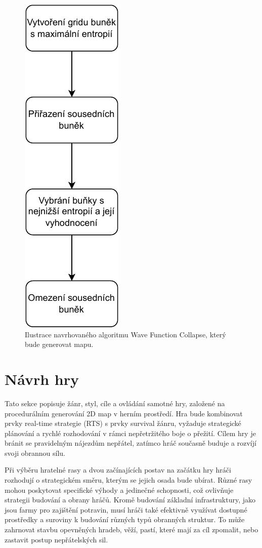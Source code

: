 \begin{figure}[H]
	\centering
	\includegraphics[scale=1]{obrazky-figures/wfcAlgorithm.pdf}
	\caption{Ilustrace navrhovaného algoritmu Wave Function Collapse, který bude generovat mapu.}
	\label{wfcAlgorithm}
\end{figure}

\section{Návrh hry}
\label{GameDesign}
Tato sekce popisuje žánr, styl, cíle a ovládání samotné hry, založené na procedurálním generování 2D map v herním prostředí. Hra bude kombinovat prvky real-time strategie (RTS) s prvky survival žánru, vyžaduje strategické plánování a rychlé rozhodování v rámci nepřetržitého boje o přežití. Cílem hry je bránit se pravidelným nájezdům nepřátel, zatímco hráč současně buduje a rozvíjí svoji obrannou sílu.

Při výběru hratelné rasy a dvou začínajících postav na začátku hry hráči rozhodují o strategickém směru, kterým se jejich osada bude ubírat. Různé rasy mohou poskytovat specifické výhody a jedinečné schopnosti, což ovlivňuje strategii budování a obrany hráčů. Kromě budování základní infrastruktury, jako jsou farmy pro zajištění potravin, musí hráči také efektivně využívat dostupné prostředky a suroviny k budování různých typů obranných struktur. To může zahrnovat stavbu opevněných hradeb, věží, pastí, které mají za cíl zpomalit, nebo zastavit postup nepřátelských sil.


